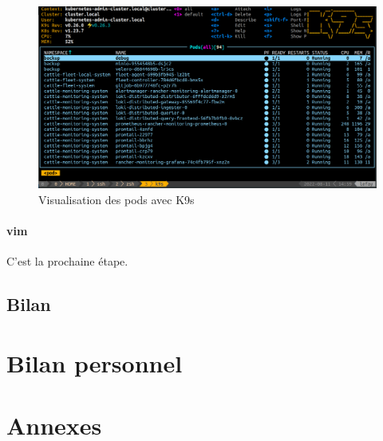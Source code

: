 \documentclass[12pt]{article}
\begin{document}
\begin{figure}[!ht]
    \centering
        \includegraphics[width=\textwidth]{src/k9s.png}
    \caption{Visualisation des pods avec K9s}
    \label{fig:k9s}
\end{figure}

\paragraph{vim}
C'est la prochaine étape.

\newpage
\subsection{Bilan}

\newpage
\section{Bilan personnel}


\newpage
\section{Annexes}
\end{document}
